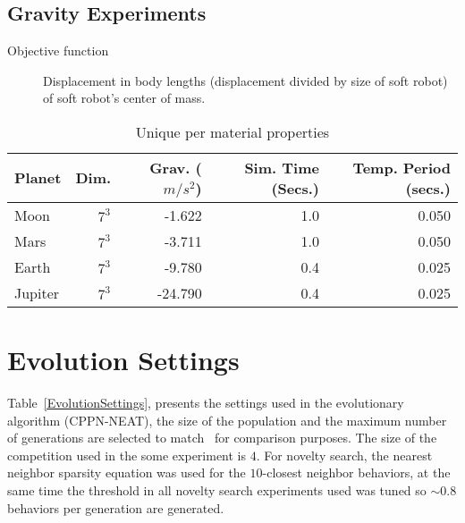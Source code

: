 \section{Gravity Experiments}
\label{gravitySettings}
\begin{small}
\begin{description}
\item[Objective function]{Displacement in body lengths (displacement divided by size of soft robot) of soft robot's center of mass.}
\end{description}
\end{small}
\begin{table}[ht!]
\centering
\caption{Unique per material properties}
\label{UniqueMaterialProperties}
    \begin{tabular}{lrrrr}
    \toprule
    \textbf{Planet} & \textbf{Dim.} & \textbf{Grav.} ($m/s^2$) & \textbf{Sim. Time} (Secs.) & \textbf{Temp. Period} (secs.) \\
    \midrule
    Moon & $7^3$ & -1.622 & 1.0 & 0.050 \\
    Mars & $7^3$ & -3.711 & 1.0 & 0.050 \\
    Earth & $7^3$ & -9.780 & 0.4 & 0.025 \\
    Jupiter & $7^3$ & -24.790 & 0.4 & 0.025\\
    \bottomrule
    \end{tabular}
\end{table}


\chapter{Evolution Settings} %

\label{AppendixB} %


Table~\ref{EvolutionSettings}, presents the settings used in the evolutionary algorithm (CPPN-NEAT), the size of the population and the maximum number of generations are selected to match~\cite{cheney2013unshackling} for comparison purposes. The size of the competition used in the some experiment is $4$. For novelty search, the nearest neighbor sparsity equation was used for the $10$-closest neighbor behaviors, at the same time the threshold in all novelty search experiments used was tuned so $\sim 0.8$ behaviors per generation are generated.

